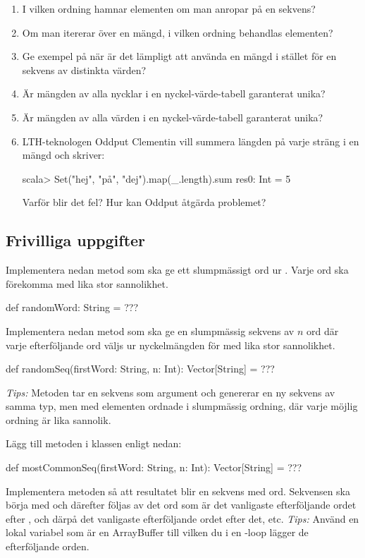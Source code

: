 \begin{enumerate}
\item I vilken ordning hamnar elementen om man anropar  på en sekvens?

\item Om man itererar över en mängd, i vilken ordning behandlas elementen?

\item Ge exempel på när är det lämpligt att använda en mängd i stället för en sekvens av distinkta värden?

\item Är mängden av alla nycklar i en nyckel-värde-tabell garanterat unika?

\item Är mängden av alla värden i en nyckel-värde-tabell garanterat unika?

\item LTH-teknologen Oddput Clementin vill summera längden på varje sträng i en mängd och skriver:
\begin{REPL}
scala> Set("hej", "på", "dej").map(_.length).sum
res0: Int = 5
\end{REPL}
Varför blir det fel? Hur kan Oddput åtgärda problemet?
\end{enumerate}

\subsection{Frivilliga uppgifter}

\Task Implementera nedan metod som ska ge ett slumpmässigt ord ur . Varje ord ska förekomma med lika stor sannolikhet.
\begin{Code}
def randomWord: String = ???
\end{Code}

\Task \label{task:words:randomSeq} Implementera nedan metod som ska ge en slumpmässig sekvens av $n$ ord där varje efterföljande ord väljs ur nyckelmängden för  med lika stor sannolikhet.
\begin{Code}
def randomSeq(firstWord: String, n: Int): Vector[String] = ???
\end{Code}
\emph{Tips:} Metoden  tar en sekvens som argument och genererar en ny sekvens av samma typ, men med elementen ordnade i slumpmässig ordning, där varje möjlig ordning är lika sannolik.

\Task \label{task:words:mostCommonSeq} Lägg till metoden  i klassen  enligt nedan:
\begin{Code}
def mostCommonSeq(firstWord: String, n: Int): Vector[String] = ???
\end{Code}
\Subtask Implementera metoden så att resultatet blir en sekvens med  ord. Sekvensen ska börja med  och därefter följas av det ord som är det vanligaste efterföljande ordet efter , och därpå det vanligaste efterföljande ordet efter det, etc. \emph{Tips:} Använd en lokal variabel  som är en ArrayBuffer till vilken du i en -loop lägger de efterföljande orden.

